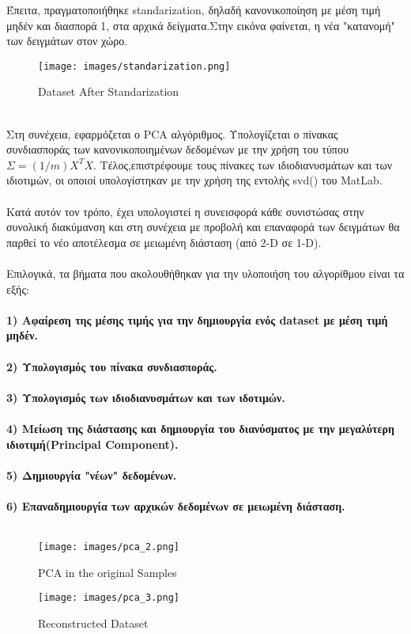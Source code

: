 \documentclass[12pt]{article}
\begin{document}
 Έπειτα, πραγματοποιήθηκε standarization, δηλαδή κανονικοποίηση με μέση τιμή μηδέν και διασπορά 1, στα αρχικά δείγματα.Στην εικόνα φαίνεται, η νέα "κατανομή" των δειγμάτων στον χώρο.\\
 \begin{figure}[!h]
     \centering
     \texttt{[image: images/standarization.png]}
     \caption{Dataset After Standarization}
     \label{fig:my_label}
 \end{figure}\\
 Στη συνέχεια, εφαρμόζεται ο PCA αλγόριθμος. Υπολογίζεται ο πίνακας συνδιασποράς των κανονικοποιημένων δεδομένων με την χρήση του τύπου \(Σ = (1 / m) X^T X\). Τέλος,επιστρέφουμε τους πίνακες των ιδιοδιανυσμάτων και των ιδιοτιμών, οι οποιοί υπολογίστηκαν με την χρήση της εντολής svd() του MatLab.\\ \\
 Κατά αυτόν τον τρόπο, έχει υπολογιστεί η συνεισφορά κάθε συνιστώσας στην συνολική διακύμανση και στη συνέχεια με προβολή και επαναφορά των δειγμάτων θα παρθεί το νέο αποτέλεσμα σε μειωμένη διάσταση (από 2-D σε 1-D).\\ 
 \\
Επιλογικά, τα βήματα που ακολουθήθηκαν για την υλοποιήση του αλγορίθμου είναι τα εξής:\\\\
{\bfseries 1) Αφαίρεση της μέσης τιμής για την δημιουργία ενός dataset με μέση τιμή μηδέν.\\\\
2) Υπολογισμός του πίνακα συνδιασποράς.\\\\
3) Υπολογισμός των ιδιοδιανυσμάτων και των ιδοτιμών.\\\\
4) Μείωση της διάστασης και δημιουργία του διανύσματος με την μεγαλύτερη ιδιοτιμή(Principal Component).\\\\
5) Δημιουργία "νέων" δεδομένων.\\\\
6) Επαναδημιουργία των αρχικών δεδομένων σε μειωμένη διάσταση.}\\\\

\begin{figure}
\centering
\begin{minipage}{.5\textwidth}
  \centering
  \texttt{[image: images/pca\_2.png]}
  \caption{PCA in the original Samples}
  \label{fig:my_label}
\end{minipage}%
\begin{minipage}{.5\textwidth}
  \centering
  \texttt{[image: images/pca\_3.png]}
  \caption{Reconstructed Dataset }
  \label{fig:my_label}
\end{minipage}
\end{figure}
\end{document}
